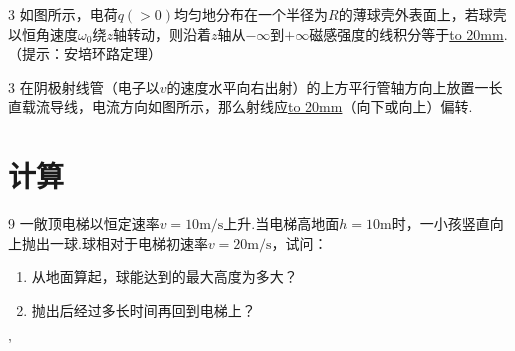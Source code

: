\hspace{-2.16em}
\begin{minipage}{0.67\textwidth}
    \begin{exercise}{3}{}
        如图所示，电荷$q(>0)$均匀地分布在一个半径为$R$的薄球壳外表面上，若球壳以恒角速度$\omega_0$绕$z$轴转动，则沿着$z$轴从$-\infty$到$+\infty$磁感强度的线积分等于\underline{\hbox to 20mm{}}.（提示：安培环路定理）
        \end{exercise}
\end{minipage}
\hfill
\begin{minipage}[c]{0.33\textwidth}
\begin{center}
    \begin{tikzpicture}
    
    \end{tikzpicture}
\end{center}
\end{minipage}

\hspace{-2.16em}
\begin{minipage}{0.67\textwidth}
    \begin{exercise}{3}{}
        在阴极射线管（电子以$v$的速度水平向右出射）的上方平行管轴方向上放置一长直载流导线，电流方向如图所示，那么射线应\underline{\hbox to 20mm{}}（向下或向上）偏转.
        \end{exercise}
\end{minipage}
\hfill
\begin{minipage}[c]{0.33\textwidth}
\begin{center}
    \begin{tikzpicture}
    
    \end{tikzpicture}
\end{center}
\end{minipage}

\section{计算}
\begin{exercise}{9}{}
一敞顶电梯以恒定速率$v=10\mathrm{m/s}$上升.当电梯高地面$h=10\mathrm{m}$时，一小孩竖直向上抛出一球.球相对于电梯初速率$v=20\mathrm{m/s}$，试问：
\begin{enumerate}[(1)]
    \item 从地面算起，球能达到的最大高度为多大？
    \item 抛出后经过多长时间再回到电梯上？
\end{enumerate}
\end{exercise}'

